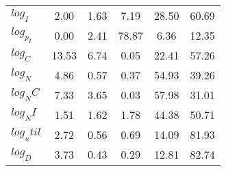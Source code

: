\begin{center}
\begin{longtable}{lccccc}
$log_I     $	 & 	        2.00	 & 	        1.63	 & 	        7.19	 & 	       28.50	 & 	       60.69 \\ 
$log_p_I   $	 & 	        0.00	 & 	        2.41	 & 	       78.87	 & 	        6.36	 & 	       12.35 \\ 
$log_C     $	 & 	       13.53	 & 	        6.74	 & 	        0.05	 & 	       22.41	 & 	       57.26 \\ 
$log_N     $	 & 	        4.86	 & 	        0.57	 & 	        0.37	 & 	       54.93	 & 	       39.26 \\ 
$log_NC    $	 & 	        7.33	 & 	        3.65	 & 	        0.03	 & 	       57.98	 & 	       31.01 \\ 
$log_NI    $	 & 	        1.51	 & 	        1.62	 & 	        1.78	 & 	       44.38	 & 	       50.71 \\ 
$log_util  $	 & 	        2.72	 & 	        0.56	 & 	        0.69	 & 	       14.09	 & 	       81.93 \\ 
$log_D     $	 & 	        3.73	 & 	        0.43	 & 	        0.29	 & 	       12.81	 & 	       82.74 \\ 
\end{longtable}
 \end{center}
